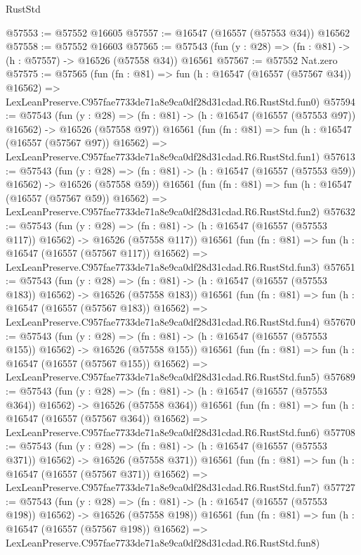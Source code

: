 \begin{lexlean}{RustStd}
\begin{coremodule}
@57553 := @57552 @16605
@57557 := @16547 (@16557 (@57553 @34)) @16562
@57558 := @57552 @16603
@57565 := @57543 (fun (y : @28) => (fn : @81) -> (h : @57557) -> @16526 (@57558 @34)) @16561
@57567 := @57552 Nat.zero
@57575 := @57565
    (fun (fn : @81) =>
    fun (h : @16547 (@16557 (@57567 @34)) @16562) =>
    LexLeanPreserve.C957fae7733de71a8e9ca0df28d31cdad.R6.RustStd.fun0)
@57594 := @57543
    (fun (y : @28) =>
    (fn : @81) -> (h : @16547 (@16557 (@57553 @97)) @16562) -> @16526 (@57558 @97))
    @16561
    (fun (fn : @81) =>
    fun (h : @16547 (@16557 (@57567 @97)) @16562) =>
    LexLeanPreserve.C957fae7733de71a8e9ca0df28d31cdad.R6.RustStd.fun1)
@57613 := @57543
    (fun (y : @28) =>
    (fn : @81) -> (h : @16547 (@16557 (@57553 @59)) @16562) -> @16526 (@57558 @59))
    @16561
    (fun (fn : @81) =>
    fun (h : @16547 (@16557 (@57567 @59)) @16562) =>
    LexLeanPreserve.C957fae7733de71a8e9ca0df28d31cdad.R6.RustStd.fun2)
@57632 := @57543
    (fun (y : @28) =>
    (fn : @81) -> (h : @16547 (@16557 (@57553 @117)) @16562) -> @16526 (@57558 @117))
    @16561
    (fun (fn : @81) =>
    fun (h : @16547 (@16557 (@57567 @117)) @16562) =>
    LexLeanPreserve.C957fae7733de71a8e9ca0df28d31cdad.R6.RustStd.fun3)
@57651 := @57543
    (fun (y : @28) =>
    (fn : @81) -> (h : @16547 (@16557 (@57553 @183)) @16562) -> @16526 (@57558 @183))
    @16561
    (fun (fn : @81) =>
    fun (h : @16547 (@16557 (@57567 @183)) @16562) =>
    LexLeanPreserve.C957fae7733de71a8e9ca0df28d31cdad.R6.RustStd.fun4)
@57670 := @57543
    (fun (y : @28) =>
    (fn : @81) -> (h : @16547 (@16557 (@57553 @155)) @16562) -> @16526 (@57558 @155))
    @16561
    (fun (fn : @81) =>
    fun (h : @16547 (@16557 (@57567 @155)) @16562) =>
    LexLeanPreserve.C957fae7733de71a8e9ca0df28d31cdad.R6.RustStd.fun5)
@57689 := @57543
    (fun (y : @28) =>
    (fn : @81) -> (h : @16547 (@16557 (@57553 @364)) @16562) -> @16526 (@57558 @364))
    @16561
    (fun (fn : @81) =>
    fun (h : @16547 (@16557 (@57567 @364)) @16562) =>
    LexLeanPreserve.C957fae7733de71a8e9ca0df28d31cdad.R6.RustStd.fun6)
@57708 := @57543
    (fun (y : @28) =>
    (fn : @81) -> (h : @16547 (@16557 (@57553 @371)) @16562) -> @16526 (@57558 @371))
    @16561
    (fun (fn : @81) =>
    fun (h : @16547 (@16557 (@57567 @371)) @16562) =>
    LexLeanPreserve.C957fae7733de71a8e9ca0df28d31cdad.R6.RustStd.fun7)
@57727 := @57543
    (fun (y : @28) =>
    (fn : @81) -> (h : @16547 (@16557 (@57553 @198)) @16562) -> @16526 (@57558 @198))
    @16561
    (fun (fn : @81) =>
    fun (h : @16547 (@16557 (@57567 @198)) @16562) =>
    LexLeanPreserve.C957fae7733de71a8e9ca0df28d31cdad.R6.RustStd.fun8)

\end{coremodule}
\end{lexlean}
